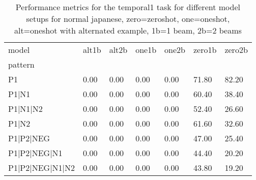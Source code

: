 \begin{table}[h]
\begin{tabular}{l|llllll}
\toprule
model & alt1b & alt2b & one1b & one2b & zero1b & zero2b \\
pattern &  &  &  &  &  &  \\
\midrule
P1 & 0.00 & 0.00 & 0.00 & 0.00 & 71.80 & 82.20 \\
P1|N1 & 0.00 & 0.00 & 0.00 & 0.00 & 60.40 & 38.40 \\
P1|N1|N2 & 0.00 & 0.00 & 0.00 & 0.00 & 52.40 & 26.60 \\
P1|N2 & 0.00 & 0.00 & 0.00 & 0.00 & 61.60 & 32.60 \\
P1|P2|NEG & 0.00 & 0.00 & 0.00 & 0.00 & 47.00 & 25.40 \\
P1|P2|NEG|N1 & 0.00 & 0.00 & 0.00 & 0.00 & 44.40 & 20.20 \\
P1|P2|NEG|N1|N2 & 0.00 & 0.00 & 0.00 & 0.00 & 43.80 & 19.20 \\
\bottomrule
\end{tabular}
\caption{Performance metrics for the temporal1 task for different model setups for normal japanese, zero=zeroshot, one=oneshot, alt=oneshot with alternated example, 1b=1 beam, 2b=2 beams}
\label{tab:ja norm_temporal1_performance}
\end{table}
